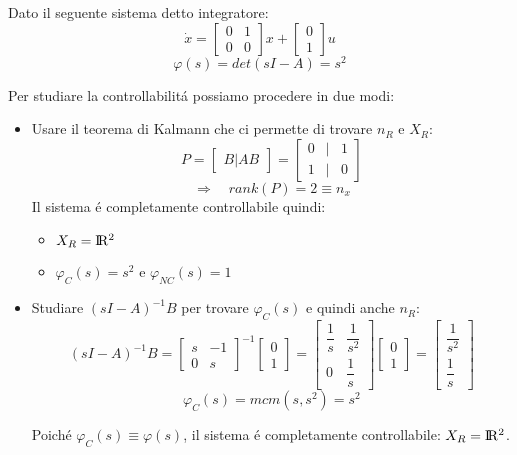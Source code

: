 \documentclass[../main.tex]{subfiles}
\begin{document}
		\begin{Exercise}[title={Calcolare $ X_R $ e $ \varphi_C(s) $}, difficulty=1]
			Dato il seguente sistema detto integratore:
			\[ 
				\dot x =
				\begin{bmatrix}
					0 & 1\\
					0 & 0
				\end{bmatrix} x +
				\begin{bmatrix}
					0\\
					1
				\end{bmatrix} u
			\]
			\[ \varphi(s) = det\left( sI-A \right) = s^2 \]
			
			Per studiare la controllabilit\'a possiamo procedere in due modi:
			\begin{itemize}
				\item
					Usare il teorema di Kalmann che ci permette di trovare $ n_R $ e $ X_R $:
					\[
						P =
						\begin{bmatrix}
							B | AB
						\end{bmatrix} =
						\begin{bmatrix}
							0 & | & 1\\
							1 & | & 0
						\end{bmatrix}
					\]
					\[ \Rightarrow\quad rank\left( P \right) = 2 \equiv n_x \]
					Il sistema \'e completamente controllabile quindi: 
					\begin{itemize}
						\item $ X_R = \rm I\!R^2 $
						\item $ \varphi_C(s) = s^2 $ e $ \varphi_{NC}(s) = 1 $
					\end{itemize}
				\item
					Studiare $ (sI-A)^{-1}B $ per trovare $ \varphi_C(s) $ e quindi anche $ n_R $:
					\[
						(sI-A)^{-1}B =
						\begin{bmatrix}
							s & -1\\
							0 & s
						\end{bmatrix}^{-1}
						\begin{bmatrix}
							0\\
							1
						\end{bmatrix}=
						\begin{bmatrix}
							\dfrac{1}{s} & \dfrac{1}{s^2}\\
							0 & \dfrac{1}{s}
						\end{bmatrix}
						\begin{bmatrix}
							0\\
							1
						\end{bmatrix} =
						\begin{bmatrix}
							\dfrac{1}{s^2}\\
							\dfrac{1}{s}
						\end{bmatrix}	
					\]
					\[ \varphi_C(s) = mcm\left( s, s^2 \right) = s^2 \]
					
					Poich\'e $ \varphi_C(s) \equiv \varphi(s) $, il sistema \'e completamente controllabile: $ X_R = \rm I\!R^2 $.
			\end{itemize}
		\end{Exercise}
	
\end{document}
